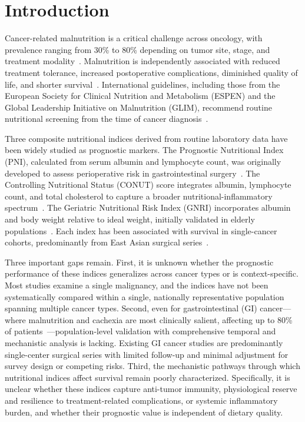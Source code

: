 \documentclass[review]{elsarticle}
\begin{document}
\section{Introduction}

Cancer-related malnutrition is a critical challenge across oncology, with prevalence ranging from 30\% to 80\% depending on tumor site, stage, and treatment modality~\cite{muscaritoli2021,arends2017,fearon2011,hebuterne2014,pressoir2010}. Malnutrition is independently associated with reduced treatment tolerance, increased postoperative complications, diminished quality of life, and shorter survival~\cite{muscaritoli2021}. International guidelines, including those from the European Society for Clinical Nutrition and Metabolism (ESPEN) and the Global Leadership Initiative on Malnutrition (GLIM), recommend routine nutritional screening from the time of cancer diagnosis~\cite{muscaritoli2021,cederholm2019}.

Three composite nutritional indices derived from routine laboratory data have been widely studied as prognostic markers. The Prognostic Nutritional Index (PNI), calculated from serum albumin and lymphocyte count, was originally developed to assess perioperative risk in gastrointestinal surgery~\cite{onodera1984}. The Controlling Nutritional Status (CONUT) score integrates albumin, lymphocyte count, and total cholesterol to capture a broader nutritional-inflammatory spectrum~\cite{ignacio2005}. The Geriatric Nutritional Risk Index (GNRI) incorporates albumin and body weight relative to ideal weight, initially validated in elderly populations~\cite{bouillanne2005}. Each index has been associated with survival in single-cancer cohorts, predominantly from East Asian surgical series~\cite{yang2016,sun2014,pinato2012,kanda2011,migita2013,nozoe2012}.

Three important gaps remain. First, it is unknown whether the prognostic performance of these indices generalizes across cancer types or is context-specific. Most studies examine a single malignancy, and the indices have not been systematically compared within a single, nationally representative population spanning multiple cancer types. Second, even for gastrointestinal (GI) cancer---where malnutrition and cachexia are most clinically salient, affecting up to 80\% of patients~\cite{kapala2025}---population-level validation with comprehensive temporal and mechanistic analysis is lacking. Existing GI cancer studies are predominantly single-center surgical series with limited follow-up and minimal adjustment for survey design or competing risks. Third, the mechanistic pathways through which nutritional indices affect survival remain poorly characterized. Specifically, it is unclear whether these indices capture anti-tumor immunity, physiological reserve and resilience to treatment-related complications, or systemic inflammatory burden, and whether their prognostic value is independent of dietary quality.
\end{document}
